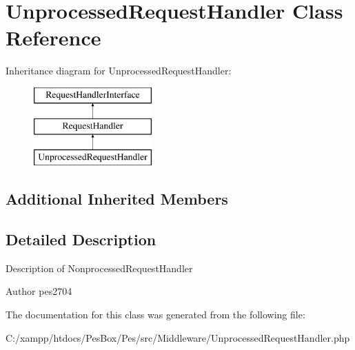 \hypertarget{class_pes_1_1_middleware_1_1_unprocessed_request_handler}{}\section{Unprocessed\+Request\+Handler Class Reference}
\label{class_pes_1_1_middleware_1_1_unprocessed_request_handler}
Inheritance diagram for Unprocessed\+Request\+Handler\+:\begin{figure}[H]
\begin{center}
\leavevmode
\includegraphics[height=3.000000cm]{class_pes_1_1_middleware_1_1_unprocessed_request_handler}
\end{center}
\end{figure}
\subsection*{Additional Inherited Members}


\subsection{Detailed Description}
Description of Nonprocessed\+Request\+Handler

\begin{DoxyAuthor}{Author}
pes2704 
\end{DoxyAuthor}


The documentation for this class was generated from the following file\+:\begin{DoxyCompactItemize}
\item 
C\+:/xampp/htdocs/\+Pes\+Box/\+Pes/src/\+Middleware/Unprocessed\+Request\+Handler.\+php\end{DoxyCompactItemize}

